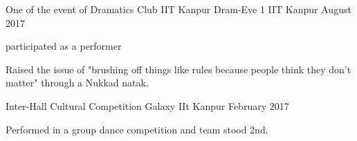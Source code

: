 \begin{cventries}
  \cventry
    {One of the event of Dramatics Club IIT Kanpur}
    {Dram-Eve 1 }
    {IIT Kanpur}
    {August 2017}
    {
      \begin{cvitems}
	\item{participated as a performer}
        \item {Raised the issue of "brushing off things like rules because people think they don't matter" through a Nukkad natak.}
      \end{cvitems}
    }
  \cventry
    {Inter-Hall Cultural Competition}
    {Galaxy}
    {IIt Kanpur}
    {February 2017}
    {
      \begin{cvitems}
        \item {Performed in a group dance competition and team stood 2nd.}
      \end{cvitems}
    }
\end{cventries}
